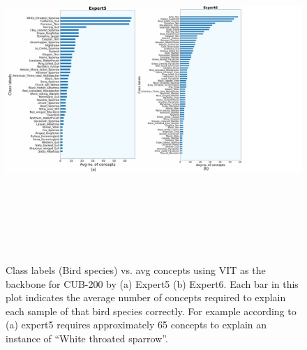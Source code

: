 \begin{figure}
\centering
\includegraphics[width=14cm, height=13cm]
{figures/Supp/Avg_concept_class_VIT_cub_3.pdf}
\caption{Class labels (Bird species) vs. avg concepts using VIT as the backbone for CUB-200 by (a) Expert5 (b) Expert6. Each bar in this plot indicates the average number of concepts required to explain each sample of that bird species correctly. For example according to (a) expert5 requires approximately 65 concepts to explain an instance of ``White throated sparrow''.}
\label{fig:vit_cub_concept_5_6}
\end{figure}

